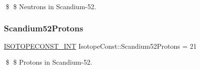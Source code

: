\$ \$ Neutrons in Scandium-\/52. \mbox{\label{group___isotope_const-_scandium-_sc52_gaff25ba3e473c978f59677dc61e7ad5a7}} 
\subsubsection{\texorpdfstring{Scandium52\+Protons}{Scandium52Protons}}
{\footnotesize\ttfamily \mbox{\hyperlink{group___isotope_const-_macros_ga5f18360b3e99483a35c32d789e62621c}{I\+S\+O\+T\+O\+P\+E\+C\+O\+N\+S\+T\+\_\+\+I\+NT}} Isotope\+Const\+::\+Scandium52\+Protons = 21}

\$ \$ Protons in Scandium-\/52. 